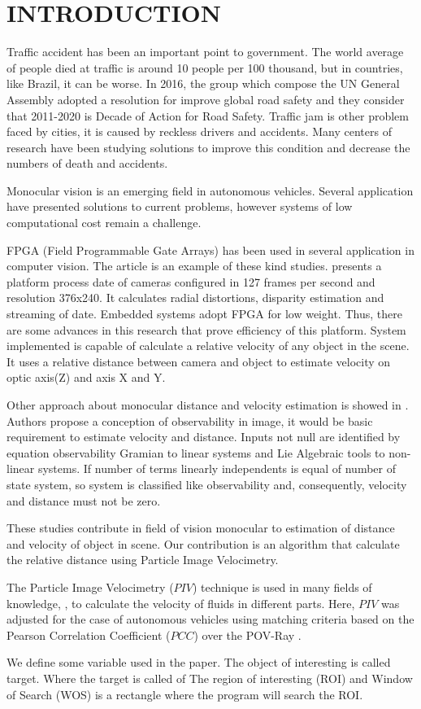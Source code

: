 \section{INTRODUCTION}

Traffic accident has been an important point to government. The world average of people
died at traffic is around 10 people per 100 thousand, but in countries, like Brazil, it can be worse.
In 2016, the group which compose the UN General Assembly adopted a resolution for
improve global road safety and they consider that 2011-2020 is Decade of Action for Road Safety.
Traffic jam is other problem faced by cities, it is caused by reckless drivers and accidents.
Many centers of research have been studying solutions to improve this condition and decrease the 
numbers of death and accidents.

Monocular vision is an emerging field in autonomous vehicles. 
Several application have presented solutions to current problems, 
however systems  of low computational cost remain a challenge.

FPGA (Field Programmable Gate Arrays) has been used in several application in computer vision. The article \cite{Honegger} 
is an example of these kind studies. \cite{Honegger} presents a platform process date of 
cameras configured in 127 frames per second and resolution 376x240. It calculates radial distortions, disparity estimation
and streaming of date. Embedded systems adopt FPGA for low weight. Thus, there are some advances in this research 
that prove efficiency of this platform. System implemented is capable of calculate a relative velocity of any object 
in the scene. It uses a relative distance between camera and object to estimate velocity on optic axis(Z) and axis X and Y.

Other approach about monocular distance and velocity estimation is showed in \cite{Breugel}. Authors propose a conception of 
observability in image, it would be basic requirement to estimate velocity and distance. Inputs not null are identified by
equation observability Gramian to linear systems and Lie Algebraic tools to non-linear systems. If 
number of terms linearly independents is equal of number of state system, so system is classified like observability and, 
consequently, velocity and distance must not be zero.

These studies contribute in field of vision monocular to estimation of distance and velocity of object in scene. 
Our contribution is an algorithm that calculate the relative distance using Particle Image Velocimetry.


The Particle Image Velocimetry ($PIV$)\cite{Bastiaans} technique is used in many fields of 
knowledge, \cite{Story, Xu}, to calculate the velocity of fluids in different parts. 
Here, $PIV$ was adjusted for the case of autonomous vehicles using matching criteria based on 
the Pearson Correlation Coefficient ($PCC$)\cite{Miranda Neto} over the POV-Ray \cite{povray}.

We define some variable used in the paper. The object of interesting is called target.
Where the target is called of The region of interesting (ROI) and
Window of Search (WOS) is a rectangle where the program will search the ROI. 


